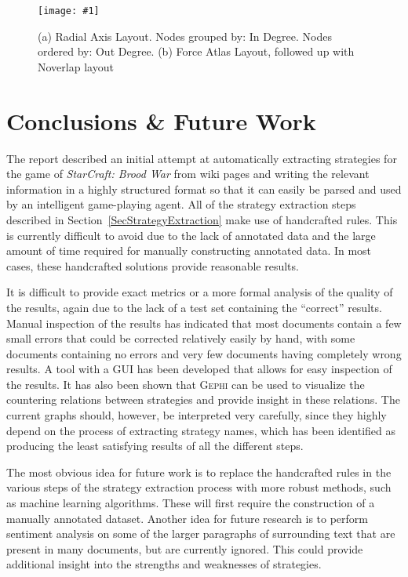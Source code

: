 \documentclass[]{article}
\newcommand{\insertfigure}[3]{ 
	\begin{figure}[#3]
	\begin{center}
	\texttt{[image: \#1]}
	\caption{#2}
	\label{#1}
	\end{center}
	\end{figure}
}
\newcommand{\refsection}[1]{Section~\ref{#1}}
\begin{document}
\insertfigure{GephiGraphs}{(a) Radial Axis Layout. Nodes grouped by: In Degree. Nodes ordered by: Out Degree. (b) Force Atlas Layout, followed up with Noverlap layout}{h}

\section{Conclusions \& Future Work} \label{SecConclusionsFutureWork}
The report described an initial attempt at automatically extracting strategies for the game of \emph{StarCraft: Brood War} from wiki pages and writing the relevant information in a highly structured format so that it can easily be parsed and used by an intelligent game-playing agent. All of the strategy extraction steps described in \refsection{SecStrategyExtraction} make use of handcrafted rules. This is currently difficult to avoid due to the lack of annotated data and the large amount of time required for manually constructing annotated data. In most cases, these handcrafted solutions provide reasonable results. 

It is difficult to provide exact metrics or a more formal analysis of the quality of the results, again due to the lack of a test set containing the ``correct'' results. Manual inspection of the results has indicated that most documents contain a few small errors that could be corrected relatively easily by hand, with some documents containing no errors and very few documents having completely wrong results. A tool with a GUI has been developed that allows for easy inspection of the results. It has also been shown that \textsc{Gephi} can be used to visualize the countering relations between strategies and provide insight in these relations. The current graphs should, however, be interpreted very carefully, since they highly depend on the process of extracting strategy names, which has been identified as producing the least satisfying results of all the different steps.

The most obvious idea for future work is to replace the handcrafted rules in the various steps of the strategy extraction process with more robust methods, such as machine learning algorithms. These will first require the construction of a manually annotated dataset. Another idea for future research is to perform sentiment analysis on some of the larger paragraphs of surrounding text that are present in many documents, but are currently ignored. This could provide additional insight into the strengths and weaknesses of strategies.



\end{document}

